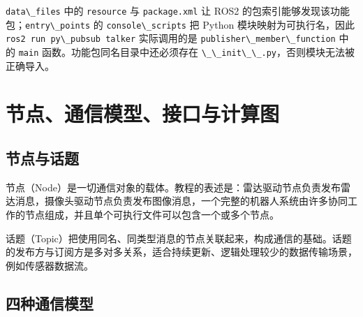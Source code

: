 \passthrough{\lstinline!data\_files!} 中的
\passthrough{\lstinline!resource!} 与
\passthrough{\lstinline!package.xml!} 让 ROS2
的包索引能够发现该功能包；\passthrough{\lstinline!entry\_points!} 的
\passthrough{\lstinline!console\_scripts!} 把 Python
模块映射为可执行名，因此
\passthrough{\lstinline!ros2 run py\_pubsub talker!} 实际调用的是
\passthrough{\lstinline!publisher\_member\_function!} 中的
\passthrough{\lstinline!main!} 函数。功能包同名目录中还必须存在
\passthrough{\lstinline!\_\_init\_\_.py!}，否则模块无法被正确导入。

\section{节点、通信模型、接口与计算图}\label{ux8282ux70b9ux901aux4fe1ux6a21ux578bux63a5ux53e3ux4e0eux8ba1ux7b97ux56fe}

\subsection{节点与话题}\label{ux8282ux70b9ux4e0eux8bddux9898}

节点（Node）是一切通信对象的载体。教程的表述是：雷达驱动节点负责发布雷达消息，摄像头驱动节点负责发布图像消息，一个完整的机器人系统由许多协同工作的节点组成，并且单个可执行文件可以包含一个或多个节点。

话题（Topic）把使用同名、同类型消息的节点关联起来，构成通信的基础。话题的发布方与订阅方是多对多关系，适合持续更新、逻辑处理较少的数据传输场景，例如传感器数据流。

\subsection{四种通信模型}\label{ux56dbux79cdux901aux4fe1ux6a21ux578b}

